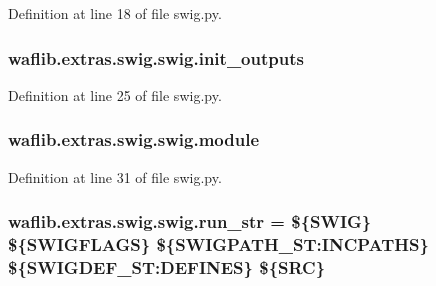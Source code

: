 Definition at line 18 of file swig.\+py.

\subsubsection[{\texorpdfstring{init\+\_\+outputs}{init_outputs}}]{\setlength{\rightskip}{0pt plus 5cm}waflib.\+extras.\+swig.\+swig.\+init\+\_\+outputs}\hypertarget{classwaflib_1_1extras_1_1swig_1_1swig_ac87a5e930d61bca4ddb0ba12c6df5dbd}{}\label{classwaflib_1_1extras_1_1swig_1_1swig_ac87a5e930d61bca4ddb0ba12c6df5dbd}


Definition at line 25 of file swig.\+py.

\subsubsection[{\texorpdfstring{module}{module}}]{\setlength{\rightskip}{0pt plus 5cm}waflib.\+extras.\+swig.\+swig.\+module}\hypertarget{classwaflib_1_1extras_1_1swig_1_1swig_a6008e295101b80084cb97379fe5d6db2}{}\label{classwaflib_1_1extras_1_1swig_1_1swig_a6008e295101b80084cb97379fe5d6db2}


Definition at line 31 of file swig.\+py.

\subsubsection[{\texorpdfstring{run\+\_\+str}{run_str}}]{ waflib.\+extras.\+swig.\+swig.\+run\+\_\+str = \textquotesingle{}\$\{S\+W\+IG\} \$\{S\+W\+I\+G\+F\+L\+A\+GS\} \$\{S\+W\+I\+G\+P\+A\+T\+H\+\_\+\+S\+T\+:\+I\+N\+C\+P\+A\+T\+HS\} \$\{S\+W\+I\+G\+D\+E\+F\+\_\+\+S\+T\+:\+D\+E\+F\+I\+N\+ES\} \$\{S\+RC\}\textquotesingle{}\hspace{0.3cm}{\ttfamily [static]}}\hypertarget{classwaflib_1_1extras_1_1swig_1_1swig_a0fd93de830f05b89980161c171372191}{}\label{classwaflib_1_1extras_1_1swig_1_1swig_a0fd93de830f05b89980161c171372191}


